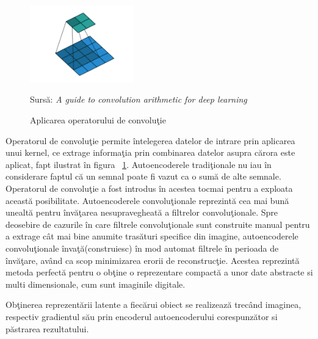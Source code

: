 \documentclass[a4paper,12pt]{report}
\newcommand{\source}[1]{\caption*{Sursă: {#1}} }
\begin{document}
\begin{figure}
	  \begin{center}
       \includegraphics[width=0.4\textwidth]{images/convolution_operator}
       \caption{Aplicarea operatorului de convoluţie}
			\label{fig:convolution_operator}
       \source {\emph{A guide to convolution arithmetic for deep learning} \cite{dumoulin2016guide}}
    \end{center}
\end{figure}

Operatorul de convoluţie permite întelegerea datelor de intrare prin aplicarea unui kernel, ce extrage informaţia prin combinarea datelor asupra cărora este aplicat, fapt ilustrat în figura ~\ref{fig:convolution_operator}. Autoencoderele tradiţionale nu iau în considerare faptul că un semnal poate fi vazut ca o sumă de alte semnale. Operatorul de convoluţie a fost introdus în acestea tocmai pentru a exploata această posibilitate.  Autoencoderele convoluţionale reprezintă cea mai bună unealtă pentru învăţarea nesupravegheată a filtrelor convoluţionale. Spre deosebire de cazurile în care filtrele convoluţionale sunt construite manual pentru a extrage cât mai bine anumite trasături specifice din imagine, autoencoderele convoluţionale învaţă(construiesc) în mod automat filtrele în perioada de învăţare, având ca scop minimizarea erorii de reconstrucţie. Acestea reprezintă metoda perfectă pentru o obţine o reprezentare compactă a unor date abstracte si multi dimensionale, cum sunt imaginile digitale.\cite{goodfellow2016}
\par Obţinerea reprezentării latente a fiecărui obiect se realizează trecând imaginea, respectiv gradientul său prin encoderul autoencoderului corespunzător si păstrarea rezultatului.
\end{document}
